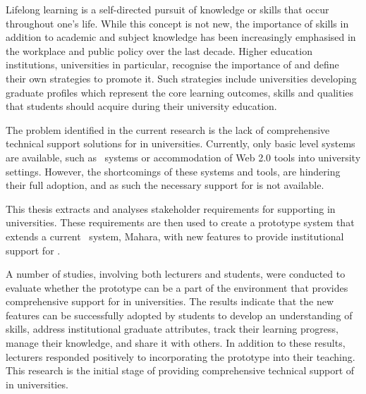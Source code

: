 Lifelong learning is a self-directed pursuit of knowledge or skills that
occur throughout one's life. While this concept is not new, the importance of
\LLLs skills in addition to academic and subject knowledge has been increasingly
emphasised in the workplace and public policy over the last decade. Higher
education institutions, universities in particular, recognise the importance
of \LLLs and define their own strategies to promote it. Such strategies include
universities developing graduate profiles which represent the core learning
outcomes, skills and qualities that students should acquire during their
university education.

The problem identified in the current research is the lack of comprehensive
technical support solutions for \LLLs in universities. Currently, only basic
level systems are available, such as \ep~systems or accommodation of
Web 2.0 tools into university settings. However, the shortcomings of these
systems and tools, are hindering their full adoption, and as such the necessary
support for \LLLs is not available.

This thesis extracts and analyses stakeholder requirements for supporting \LLLs
in universities. These requirements are then used to create a prototype system
that extends a current \ep~system, Mahara, with new features to provide
institutional support for \LLLsn.

A number of studies, involving both lecturers and students, were conducted to
evaluate whether the prototype can be a part of the environment that provides
comprehensive support for \LLLs in universities. The results indicate that the
new features can be successfully adopted by students to develop an understanding
of \LLLs skills, address institutional graduate attributes, track their learning
progress, manage their knowledge, and share it with others. In addition to these
results, lecturers responded positively to incorporating the prototype into
their teaching. This research is the initial stage of providing comprehensive
technical support of \LLLs in universities.




